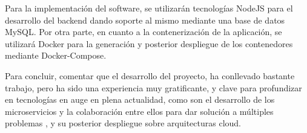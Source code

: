 Para la implementación del software, se utilizarán tecnologías NodeJS
para el desarrollo del backend dando soporte al mismo mediante una
base de datos MySQL. Por otra parte, en cuanto a la contenerización de
la aplicación, se utilizará Docker para la generación y posterior
despliegue\cite{InitMySQLDocker,MYSQL-DOckerHUB,Docean-docker,Docean-dockerCompose} de los contenedores mediante Docker-Compose.

Para concluir, comentar que el desarrollo del proyecto, ha conllevado
bastante trabajo, pero ha sido una experiencia muy gratificante, y
clave para profundizar en tecnologías en auge en plena actualidad,
como son el desarrollo de los microservicios y la colaboración entre
ellos para dar solución a múltiples problemas , y su posterior
despliegue sobre arquitecturas cloud.
